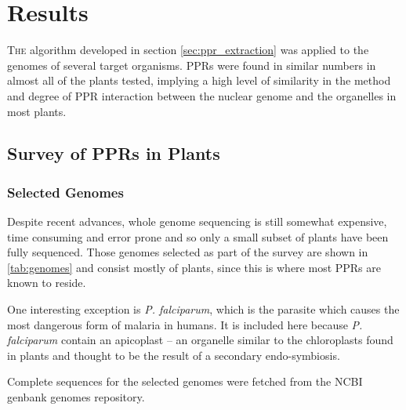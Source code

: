
\chapter{Results} 
\label{chap:results}

\lettrine{T}{he} 
algorithm developed in section \ref{sec:ppr_extraction} was applied to the
genomes of several target organisms.
PPRs were found in similar numbers in almost all of the plants tested, implying
a high level of similarity in the method and degree of PPR interaction between
the nuclear genome and the organelles in most plants.

\section{Survey of PPRs in Plants}
\label{sec:ppr_survey}

\subsection{Selected Genomes}
\label{sec:survey_genomes}

Despite recent advances, whole genome sequencing is still somewhat expensive,
time consuming and error prone and so only a small subset of plants have been
fully sequenced.
Those genomes selected as part of the survey are shown in \ref{tab:genomes} and
consist mostly of plants, since this is where most PPRs are known to reside.

One interesting exception is \emph{P. falciparum}, which is the parasite which
causes the most dangerous form of malaria in humans.
It is included here because \emph{P. falciparum} contain an apicoplast -- 
an organelle similar to the chloroplasts found in plants and thought to be the 
result of a secondary endo-symbiosis. 

Complete sequences for the selected genomes were fetched from the NCBI genbank
genomes repository.

